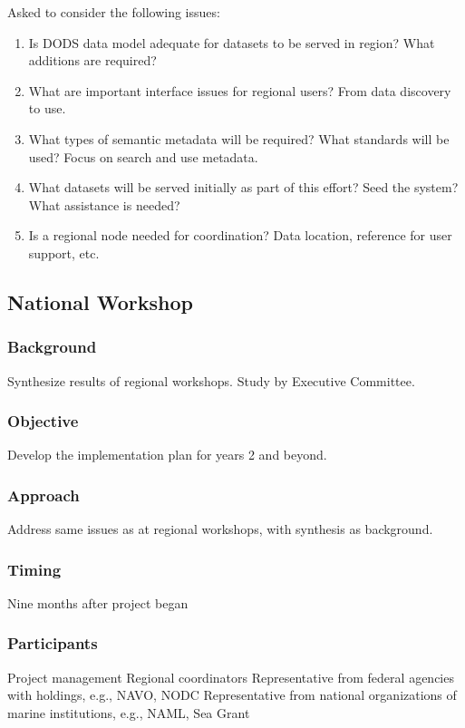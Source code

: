 Asked to consider the following issues:

\begin{enumerate}
\item Is DODS data model adequate for datasets to be served in region?
  What additions are required?
  
\item What are important interface issues for regional users? From
  data discovery to use.
  
\item What types of semantic metadata will be required? What standards
  will be used? Focus on search and use metadata.
  
\item What datasets will be served initially as part of this effort?
  Seed the system? What assistance is needed?
  
\item Is a regional node needed for coordination? Data location,
  reference for user support, etc.
\end{enumerate}

\subsection{National Workshop}

\subsubsection{Background}
        Synthesize results of regional workshops. Study by Executive Committee.

\subsubsection{Objective}
        Develop the implementation plan for years 2 and beyond.

\subsubsection{Approach}
        Address same issues as at regional workshops, with synthesis as background.

\subsubsection{Timing}
        Nine months after project began

\subsubsection{Participants}
        Project management
        Regional coordinators
        Representative from federal agencies with holdings, e.g., NAVO, NODC
        Representative from national organizations of marine institutions, e.g., NAML, Sea Grant 
